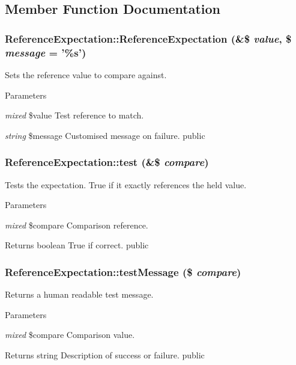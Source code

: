 \subsection{Member Function Documentation}
\hypertarget{class_reference_expectation_aa648fc5c33e580a6b661dbb85e8b5591}{
\subsubsection[{ReferenceExpectation}]{\setlength{\rightskip}{0pt plus 5cm}ReferenceExpectation::ReferenceExpectation (\&\$ {\em value}, \/  \$ {\em message} = {\ttfamily '\%s'})}}
\label{class_reference_expectation_aa648fc5c33e580a6b661dbb85e8b5591}
Sets the reference value to compare against. 
\begin{DoxyParams}{Parameters}
\item[{\em mixed}]\$value Test reference to match. \item[{\em string}]\$message Customised message on failure.  public \end{DoxyParams}
\hypertarget{class_reference_expectation_a919fb46086bf981f56b77c468c0bf4c4}{
\subsubsection[{test}]{\setlength{\rightskip}{0pt plus 5cm}ReferenceExpectation::test (\&\$ {\em compare})}}
\label{class_reference_expectation_a919fb46086bf981f56b77c468c0bf4c4}
Tests the expectation. True if it exactly references the held value. 
\begin{DoxyParams}{Parameters}
\item[{\em mixed}]\$compare Comparison reference. \end{DoxyParams}
\begin{DoxyReturn}{Returns}
boolean True if correct.  public 
\end{DoxyReturn}
\hypertarget{class_reference_expectation_a77c84b888b835ff1255f385d96f6f906}{
\subsubsection[{testMessage}]{\setlength{\rightskip}{0pt plus 5cm}ReferenceExpectation::testMessage (\$ {\em compare})}}
\label{class_reference_expectation_a77c84b888b835ff1255f385d96f6f906}
Returns a human readable test message. 
\begin{DoxyParams}{Parameters}
\item[{\em mixed}]\$compare Comparison value. \end{DoxyParams}
\begin{DoxyReturn}{Returns}
string Description of success or failure.  public 
\end{DoxyReturn}


